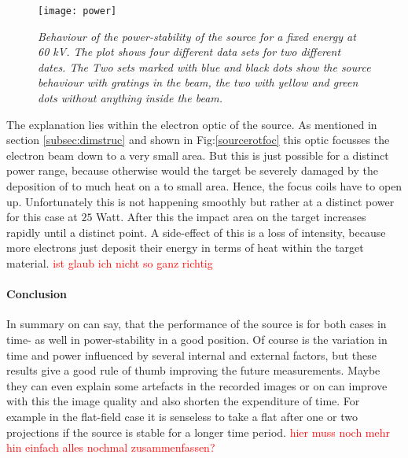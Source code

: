 \begin{figure}%
	\begin{center}
		\texttt{[image: power]}
	\end{center}
	\caption[Power-stability of the source with fixed energy to 60 kV]{\textit{Behaviour of the power-stability of the source for a fixed energy at 60 kV. The plot shows four different data sets for two different dates. The Two sets marked with blue and black dots show the source behaviour with gratings in the beam, the two with yellow and green dots without anything inside the beam. }}
	\label{powerdep}
\end{figure}
The explanation lies within the electron optic of the source. As mentioned in section \ref{subsec:dimstruc} and shown in Fig:\ref{sourcerotfoc} this optic focusses the electron beam down to a very small area. But this is just possible for a distinct power range, because otherwise would the target be severely damaged by the deposition of to much heat on a to small area. Hence, the focus coils have to open up. Unfortunately this is not happening smoothly but rather at a distinct power for this case at $25$ Watt. After this the impact area on the target increases rapidly until a distinct point. A side-effect of this is a loss of intensity, because more electrons just deposit their energy in terms of heat within the target material. \textcolor{red}{ist glaub ich nicht so ganz richtig}

\paragraph{Conclusion}
In summary on can say, that the performance of the source is for both cases in time- as well in power-stability in a good position. Of course is the variation in time and power influenced by several internal and external factors, but these results give a good rule of thumb improving the future measurements. Maybe they can even explain some artefacts in the recorded images or on can improve with this the image quality and also shorten the expenditure of time. For example in the flat-field case it is senseless to take a \gls{flat} after one or two projections if the source is stable for a longer time period. 
\textcolor{red}{hier muss noch mehr hin einfach alles nochmal zusammenfassen? }   
